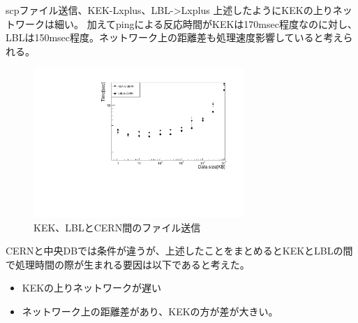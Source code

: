 scpファイル送信、KEK-Lxplus、LBL->Lxplus
上述したようにKEKの上りネットワークは細い。
加えてpingによる反応時間がKEKは170msec程度なのに対し、LBLは150msec程度。ネットワーク上の距離差も処理速度影響していると考えられる。
\begin{figure}[bpt]\centering
  \begin{center}
    \includegraphics[width=8cm,angle=270]{scp_to_cern.pdf}
  \caption[KEK、LBLとCERN間のファイル送信]{KEK、LBLとCERN間のファイル送信}
  \label{datasize_vs_time_cern}
  \end{center}
\end{figure}

CERNと中央DBでは条件が違うが、上述したことをまとめるとKEKとLBLの間で処理時間の際が生まれる要因は以下であると考えた。
\begin{itemize}
  \item KEKの上りネットワークが遅い
  \item ネットワーク上の距離差があり、KEKの方が差が大きい。
\end{itemize}

